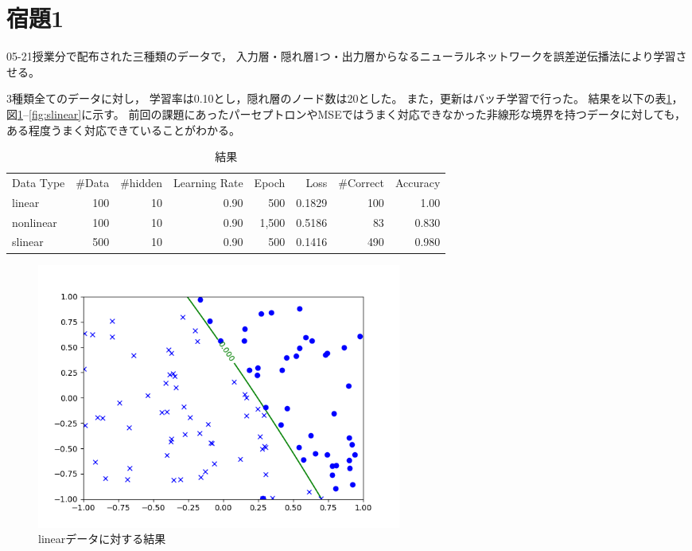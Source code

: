 \documentclass[class=jsarticle, crop=false, dvipdfmx, fleqn]{standalone}
\begin{document}
\section*{宿題1}

05-21授業分で配布された三種類のデータで，
入力層・隠れ層1つ・出力層からなるニューラルネットワークを誤差逆伝播法により学習させる。

3種類全てのデータに対し，
学習率は0.10とし，隠れ層のノード数は20とした。
また，更新はバッチ学習で行った。
結果を以下の表\ref{tab:result}，図\ref{fig:linear}--\ref{fig:slinear}に示す。
前回の課題にあったパーセプトロンやMSEではうまく対応できなかった非線形な境界を持つデータに対しても，
ある程度うまく対応できていることがわかる。


\begin{table}[H]
    \centering
    \caption{結果}
    \begin{tabular}{lrrrrrrr}
        Data Type & {\#}Data & {\#}hidden & Learning Rate & Epoch & Loss & {\#}Correct & Accuracy \\
        linear & 100 & 10 & 0.90 & 500 & 0.1829 & 100 & 1.00 \\
        nonlinear & 100 & 10 & 0.90 & 1,500 & 0.5186 & 83 & 0.830 \\
        slinear & 500 & 10 & 0.90 & 500 & 0.1416 & 490 & 0.980
    \end{tabular}
    \label{tab:result}
\end{table}

\begin{figure}[H]
    \centering
    \includegraphics[clip, width=12cm]{../figures/assignment1_1_linear_result}
    \caption{linearデータに対する結果}
    \label{fig:linear}
\end{figure}
\end{document}
